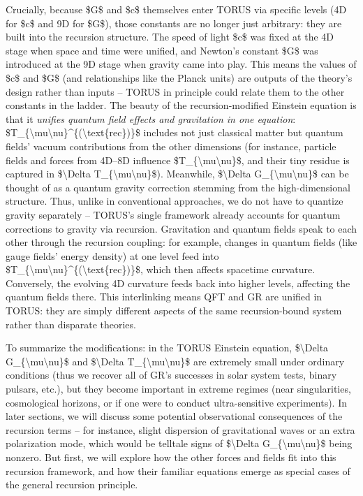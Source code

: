 \documentclass[]{article}
\begin{document}
Crucially, because \$G\$ and \$c\$ themselves enter TORUS via specific
levels (4D for \$c\$ and 9D for \$G\$), those constants are no longer
just arbitrary: they are built into the recursion structure. The speed
of light \$c\$ was fixed at the 4D stage when space and time were
unified, and Newton's constant \$G\$ was introduced at the 9D stage when
gravity came into play. This means the values of \$c\$ and \$G\$ (and
relationships like the Planck units) are outputs of the theory's design
rather than inputs -- TORUS in principle could relate them to the other
constants in the ladder. The beauty of the recursion-modified Einstein
equation is that it \emph{unifies quantum field effects and gravitation
in one equation}:
\$T\_\{\textbackslash{}mu\textbackslash{}nu\}\^{}\{(\textbackslash{}text\{rec\})\}\$
includes not just classical matter but quantum fields' vacuum
contributions from the other dimensions (for instance, particle fields
and forces from 4D--8D influence
\$T\_\{\textbackslash{}mu\textbackslash{}nu\}\$, and their tiny residue
is captured in \$\textbackslash{}Delta
T\_\{\textbackslash{}mu\textbackslash{}nu\}\$). Meanwhile,
\$\textbackslash{}Delta G\_\{\textbackslash{}mu\textbackslash{}nu\}\$
can be thought of as a quantum gravity correction stemming from the
high-dimensional structure. Thus, unlike in conventional approaches, we
do not have to quantize gravity separately -- TORUS's single framework
already accounts for quantum corrections to gravity via recursion.
Gravitation and quantum fields speak to each other through the recursion
coupling: for example, changes in quantum fields (like gauge fields'
energy density) at one level feed into
\$T\_\{\textbackslash{}mu\textbackslash{}nu\}\^{}\{(\textbackslash{}text\{rec\})\}\$,
which then affects spacetime curvature. Conversely, the evolving 4D
curvature feeds back into higher levels, affecting the quantum fields
there. This interlinking means QFT and GR are unified in TORUS: they are
simply different aspects of the same recursion-bound system rather than
disparate theories.

To summarize the modifications: in the TORUS Einstein equation,
\$\textbackslash{}Delta G\_\{\textbackslash{}mu\textbackslash{}nu\}\$
and \$\textbackslash{}Delta
T\_\{\textbackslash{}mu\textbackslash{}nu\}\$ are extremely small under
ordinary conditions (thus we recover all of GR's successes in solar
system tests, binary pulsars, etc.), but they become important in
extreme regimes (near singularities, cosmological horizons, or if one
were to conduct ultra-sensitive experiments). In later sections, we will
discuss some potential observational consequences of the recursion terms
-- for instance, slight dispersion of gravitational waves or an extra
polarization mode, which would be telltale signs of
\$\textbackslash{}Delta G\_\{\textbackslash{}mu\textbackslash{}nu\}\$
being nonzero. But first, we will explore how the other forces and
fields fit into this recursion framework, and how their familiar
equations emerge as special cases of the general recursion principle.
\end{document}
